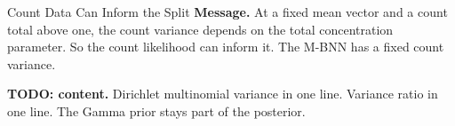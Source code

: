 \begin{frame}{Count Data Can Inform the Split}
	\textbf{Message.} At a fixed mean vector and a count total above one, the count variance depends on the total concentration parameter. So the count likelihood can inform it. The M-BNN has a fixed count variance.

	\medskip
	\textbf{TODO: content.} Dirichlet multinomial variance in one line. Variance ratio in one line. The Gamma prior stays part of the posterior.
\end{frame}
